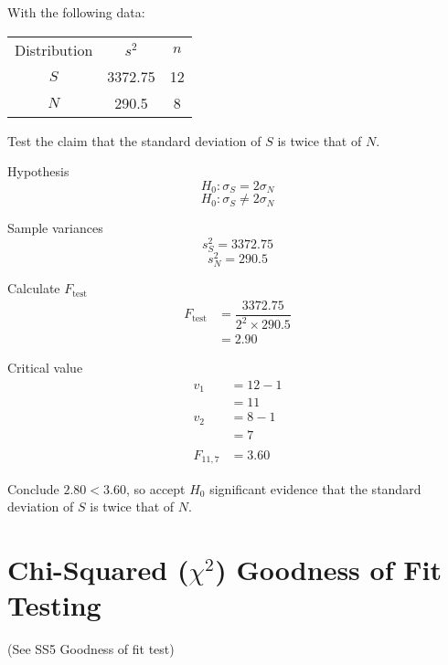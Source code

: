         \begin{example}
        {
            With the following data:
            \begin{center}
            \begin{tabular}{c|c|c}
            Distribution & $s^2$ & $n$ \\
            $S$ & 3372.75 & 12 \\
            $N$ & 290.5 & 8 \\
            \end{tabular}
            \end{center}
            Test the claim that the standard deviation of $S$ is twice that of $N$.
        }
        
        \begin{step}{Hypothesis}
            $$ H_0: \sigma_S = 2 \sigma_N $$
            $$ H_0: \sigma_S \ne 2 \sigma_N $$
        \end{step}

        \begin{step}{Sample variances}
            $$s_S^2 = 3372.75$$
            $$s_N^2 = 290.5$$
        \end{step}

        \begin{step}{Calculate $F_\text{test}$}
            \begin{align*}
                F_\text{test} &= \dfrac{3372.75}{2^2 \times 290.5}  \\
                              &= 2.90
            \end{align*}
        \end{step}

        \begin{step}{Critical value}
            \begin{align*}
            v_1 &= 12 - 1       \\
                &= 11           \\
            v_2 &= 8 - 1        \\
                &= 7            \\\\
            F_{11, 7} &= 3.60
            \end{align*}
        \end{step}

        \begin{step}{Conclude}
            $2.80 < 3.60$, so accept $H_0$ significant evidence that the standard deviation of $S$ is twice that of $N$.
        \end{step}

        \end{example}

\section{Chi-Squared ($\chi^2$) Goodness of Fit Testing}
    (See SS5 Goodness of fit test)